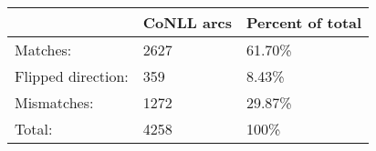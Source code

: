 	\begin{tabular}{|l|l|l|}
		\hline
		 & CoNLL arcs & Percent of total \\ 
		\hline
		Matches: & 2627 & 61.70\%\\ 
		\hline
		Flipped direction: & 359 & 8.43\%\\ 
		\hline
		Mismatches: & 1272 & 29.87\%\\ 
		\hline
		Total: & 4258 & 100\% \\ 
		\hline
	\end{tabular}
